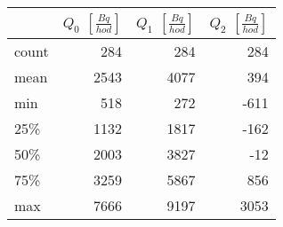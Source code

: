 \begin{tabular}{lrrr}
\toprule
{} &  $Q_0$ $\left[\si{\frac{Bq}{hod}}\right]$ &  $Q_1$ $\left[\si{\frac{Bq}{hod}}\right]$ &  $Q_2$ $\left[\si{\frac{Bq}{hod}}\right]$ \\
\midrule
count &                                       284 &                                       284 &                                       284 \\
mean  &                                      2543 &                                      4077 &                                       394 \\
min   &                                       518 &                                       272 &                                      -611 \\
25\%   &                                      1132 &                                      1817 &                                      -162 \\
50\%   &                                      2003 &                                      3827 &                                       -12 \\
75\%   &                                      3259 &                                      5867 &                                       856 \\
max   &                                      7666 &                                      9197 &                                      3053 \\
\bottomrule
\end{tabular}
